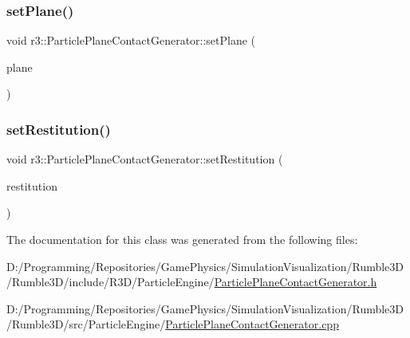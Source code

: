 \mbox{\label{classr3_1_1_particle_plane_contact_generator_a80fe5bbcb79304f020bf23a56651b833}} 
\subsubsection{\texorpdfstring{set\+Plane()}{setPlane()}}
{\footnotesize\ttfamily void r3\+::\+Particle\+Plane\+Contact\+Generator\+::set\+Plane (\begin{DoxyParamCaption}\item[{\mbox{\hyperlink{classr3_1_1_collision_plane}{Collision\+Plane}} $\ast$}]{plane }\end{DoxyParamCaption})}

\mbox{\label{classr3_1_1_particle_plane_contact_generator_ad76fbd878fbcad8ee71f6cb70031e49d}} 
\subsubsection{\texorpdfstring{set\+Restitution()}{setRestitution()}}
{\footnotesize\ttfamily void r3\+::\+Particle\+Plane\+Contact\+Generator\+::set\+Restitution (\begin{DoxyParamCaption}\item[{\mbox{\hyperlink{namespacer3_ab2016b3e3f743fb735afce242f0dc1eb}{real}}}]{restitution }\end{DoxyParamCaption})}



The documentation for this class was generated from the following files\+:\begin{DoxyCompactItemize}
\item 
D\+:/\+Programming/\+Repositories/\+Game\+Physics/\+Simulation\+Visualization/\+Rumble3\+D/\+Rumble3\+D/include/\+R3\+D/\+Particle\+Engine/\mbox{\hyperlink{_particle_plane_contact_generator_8h}{Particle\+Plane\+Contact\+Generator.\+h}}\item 
D\+:/\+Programming/\+Repositories/\+Game\+Physics/\+Simulation\+Visualization/\+Rumble3\+D/\+Rumble3\+D/src/\+Particle\+Engine/\mbox{\hyperlink{_particle_plane_contact_generator_8cpp}{Particle\+Plane\+Contact\+Generator.\+cpp}}\end{DoxyCompactItemize}
